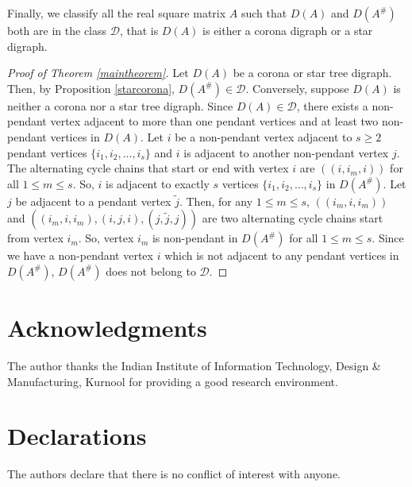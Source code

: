 \documentclass[notitlepage,12pt,reqno]{amsart}
\numberwithin{equation}{section}
\begin{document}
Finally, we classify all the real square matrix $A$ such that $D(A)$ and $D(A^{\#})$ both are in the class $\mathcal{D}$, that is $D(A)$ is either a corona digraph or a star digraph.
\begin{proof}[Proof of Theorem \ref{maintheorem}]
Let $D(A)$ be a corona or star tree digraph. Then, by Proposition \ref{starcorona}, $D(A^{\#})\in \mathcal{D}$. Conversely, suppose $D(A)$ is neither a corona nor a star tree digraph. Since $D(A)\in \mathcal{D}$, there exists a non-pendant vertex adjacent to more than one pendant vertices and at least two non-pendant vertices in $D(A)$. Let $i$ be a non-pendant vertex adjacent to $s\geq 2$ pendant vertices $\{i_1,i_2,\ldots ,i_s\}$ and $i$ is adjacent to another non-pendant vertex $j$. The alternating cycle chains that start or end with vertex $i$ are $((i,i_m,i))$ for all $1\leq m\leq s$. So, $i$ is adjacent to exactly $s$ vertices $\{i_1,i_2,\ldots ,i_s\}$ in $D(A^{\#})$. Let $j$ be adjacent to a pendant vertex $\tilde{j}$. Then, for any $1\leq m\leq s$, $((i_m,i,i_m))$ and $((i_m,i,i_m),(i,j,i),(j,\tilde{j},j))$ are two alternating cycle chains start from vertex $i_m$. So, vertex $i_m$ is non-pendant in $D(A^{\#})$ for all $1\leq m\leq s$. Since we have a non-pendant vertex $i$ which is not adjacent to any pendant vertices in $D(A^{\#})$, $D(A^{\#})$ does not belong to $\mathcal{D}$.
\end{proof}

\section*{Acknowledgments}
The author thanks the Indian Institute of Information Technology, Design \& Manufacturing, Kurnool for providing a good research environment.

\section*{Declarations}
 The authors declare that there is no conflict of interest with anyone.
\end{document}
